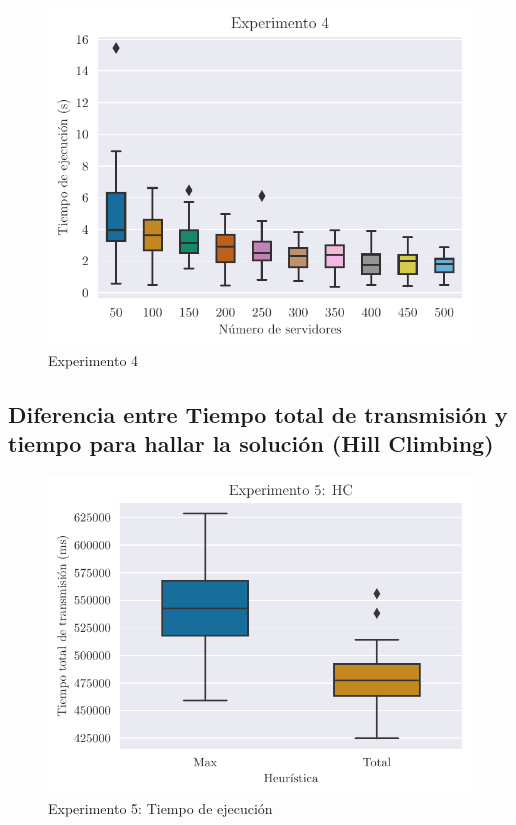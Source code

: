 \begin{figure}[H]
    \centering
    \includegraphics{include/plots/ex4_s_time_bplot_cut.pdf}
    \caption{Experimento 4}%
    \label{fig:ex4s}
\end{figure}

\subsection{Diferencia entre Tiempo total de transmisión y tiempo para hallar la solución (Hill Climbing)}

\begin{figure}[H]
    \centering
    \includegraphics{include/plots/ex5_ttt_bplot.pdf}
    \caption{Experimento 5: Tiempo de ejecución}%
    \label{fig:ex4s}
\end{figure}

